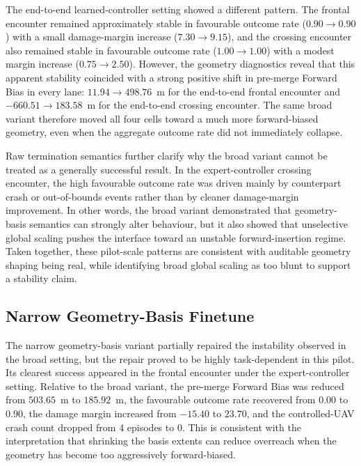 \documentclass[drones,article,submit,pdftex,moreauthors]{Definitions/mdpi}
\begin{document}
The end-to-end learned-controller setting showed a different pattern. The frontal encounter remained approximately stable in favourable outcome rate ($0.90 \rightarrow 0.90$) with a small damage-margin increase ($7.30 \rightarrow 9.15$), and the crossing encounter also remained stable in favourable outcome rate ($1.00 \rightarrow 1.00$) with a modest margin increase ($0.75 \rightarrow 2.50$). However, the geometry diagnostics reveal that this apparent stability coincided with a strong positive shift in pre-merge Forward Bias in every lane: $11.94 \rightarrow 498.76$~m for the end-to-end frontal encounter and $-660.51 \rightarrow 183.58$~m for the end-to-end crossing encounter. The same broad variant therefore moved all four cells toward a much more forward-biased geometry, even when the aggregate outcome rate did not immediately collapse.

Raw termination semantics further clarify why the broad variant cannot be treated as a generally successful result. In the expert-controller crossing encounter, the high favourable outcome rate was driven mainly by counterpart crash or out-of-bounds events rather than by cleaner damage-margin improvement. In other words, the broad variant demonstrated that geometry-basis semantics can strongly alter behaviour, but it also showed that unselective global scaling pushes the interface toward an unstable forward-insertion regime. Taken together, these pilot-scale patterns are consistent with auditable geometry shaping being real, while identifying broad global scaling as too blunt to support a stability claim.

\subsection{Narrow Geometry-Basis Finetune}

The narrow geometry-basis variant partially repaired the instability observed in the broad setting, but the repair proved to be highly task-dependent in this pilot. Its clearest success appeared in the frontal encounter under the expert-controller setting. Relative to the broad variant, the pre-merge Forward Bias was reduced from $503.65$~m to $185.92$~m, the favourable outcome rate recovered from $0.00$ to $0.90$, the damage margin increased from $-15.40$ to $23.70$, and the controlled-UAV crash count dropped from 4 episodes to 0. This is consistent with the interpretation that shrinking the basis extents can reduce overreach when the geometry has become too aggressively forward-biased.
\end{document}
